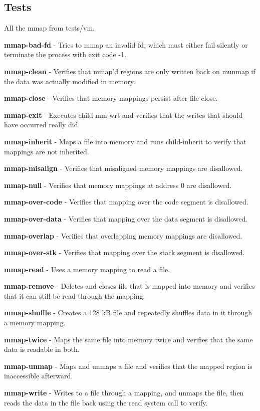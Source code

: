 \subsection{Tests}
All the mmap from tests/vm.


\textbf{mmap-bad-fd} - Tries to mmap an invalid fd, which must either fail silently or terminate the process with exit code -1.


\textbf{mmap-clean} - Verifies that mmap'd regions are only written back on munmap if the data was actually modified in memory.


\textbf{mmap-close} - Verifies that memory mappings persist after file close.


\textbf{mmap-exit} - Executes child-mm-wrt and verifies that the writes that should  have occurred really did.


\textbf{mmap-inherit} - Maps a file into memory and runs child-inherit to verify that  mappings are not inherited.


\textbf{mmap-misalign} - Verifies that misaligned memory mappings are disallowed.


\textbf{mmap-null} - Verifies that memory mappings at address 0 are disallowed.


\textbf{mmap-over-code} - Verifies that mapping over the code segment is disallowed.


\textbf{mmap-over-data} - Verifies that mapping over the data segment is disallowed.


\textbf{mmap-overlap} - Verifies that overlapping memory mappings are disallowed.


\textbf{mmap-over-stk} - Verifies that mapping over the stack segment is disallowed.


\textbf{mmap-read} - Uses a memory mapping to read a file.


\textbf{mmap-remove} - Deletes and closes file that is mapped into memory and verifies that it can still be read through the mapping.


\textbf{mmap-shuffle} - Creates a 128 kB file and repeatedly shuffles data in it through a memory mapping.


\textbf{mmap-twice} - Maps the same file into memory twice and verifies that the same data is readable in both.


\textbf{mmap-unmap} - Maps and unmaps a file and verifies that the mapped region is inaccessible afterward.


\textbf{mmap-write} - Writes to a file through a mapping, and unmaps the file, then reads the data in the file back using the read system call to verify.


